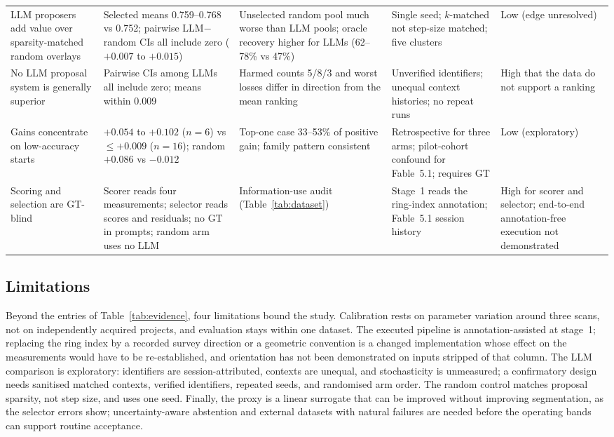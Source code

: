 \documentclass[a4paper,fleqn]{cas-dc}
\begin{document}
\begin{table}[t]
\begin{tabular}{L{0.18\textwidth} L{0.20\textwidth} L{0.21\textwidth} L{0.19\textwidth} L{0.14\textwidth}}
LLM proposers add value over sparsity-matched random overlays &
Selected means 0.759--0.768 vs 0.752; pairwise LLM$-$random CIs all include zero ($+0.007$ to $+0.015$) &
Unselected random pool much worse than LLM pools; oracle recovery higher for LLMs (62--78\% vs 47\%) &
Single seed; $k$-matched not step-size matched; five clusters &
Low (edge unresolved) \\
\addlinespace
No LLM proposal system is generally superior &
Pairwise CIs among LLMs all include zero; means within 0.009 &
Harmed counts 5/8/3 and worst losses differ in direction from the mean ranking &
Unverified identifiers; unequal context histories; no repeat runs &
High that the data do not support a ranking \\
\addlinespace
Gains concentrate on low-accuracy starts &
$+0.054$ to $+0.102$ ($n=6$) vs $\le+0.009$ ($n=16$); random $+0.086$ vs $-0.012$ &
Top-one case 33--53\% of positive gain; family pattern consistent &
Retrospective for three arms; pilot-cohort confound for Fable~5.1; requires GT &
Low (exploratory) \\
\addlinespace
Scoring and selection are GT-blind &
Scorer reads four measurements; selector reads scores and residuals; no GT in prompts; random arm uses no LLM &
Information-use audit (Table~\ref{tab:dataset}) &
Stage~1 reads the ring-index annotation; Fable~5.1 session history &
High for scorer and selector; end-to-end annotation-free execution not demonstrated \\
\bottomrule
\end{tabular}
\end{table}

\subsection{Limitations}\label{sec:limitations}

Beyond the entries of Table~\ref{tab:evidence}, four limitations bound the study. Calibration rests on parameter variation around three scans, not on independently acquired projects, and evaluation stays within one dataset. The executed pipeline is annotation-assisted at stage~1; replacing the ring index by a recorded survey direction or a geometric convention is a changed implementation whose effect on the measurements would have to be re-established, and orientation has not been demonstrated on inputs stripped of that column. The LLM comparison is exploratory: identifiers are session-attributed, contexts are unequal, and stochasticity is unmeasured; a confirmatory design needs sanitised matched contexts, verified identifiers, repeated seeds, and randomised arm order. The random control matches proposal sparsity, not step size, and uses one seed. Finally, the proxy is a linear surrogate that can be improved without improving segmentation, as the selector errors show; uncertainty-aware abstention and external datasets with natural failures are needed before the operating bands can support routine acceptance.
\end{document}

